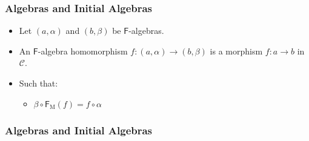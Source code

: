 \documentclass{beamer}
\DeclareMathOperator{\obj}{O}
\DeclareMathOperator{\mor}{M}
\newcommand{\comp}{\ensuremath{\mathrel{\circ}}}
\newcommand{\cat}[1]{\ensuremath{\mathcal{#1}}}
\newcommand{\func}[1]{\ensuremath{\mathsf{#1}}}
\newcommand{\funcO}[1]{\ensuremath{\func{#1}_{\obj}}}
\newcommand{\funcM}[1]{\ensuremath{\func{#1}_{\mor}}}
\begin{document}

\begin{frame}
  \frametitle{Algebras and Initial Algebras}

  \begin{definition}
    \begin{itemize}
    \item
      Let $(a,\alpha)$ and $(b,\beta)$ be \func{F}-algebras.
    \item
      An \func{F}-algebra homomorphism $f: (a,\alpha) \to (b,\beta)$
      is a morphism $f: a \to b$ in $\cat{C}$.
    \item
      Such that:
      \begin{itemize}
      \item
        $\beta \comp \funcM{F}(f) = f \comp \alpha$
      \end{itemize}
    \end{itemize}
  \end{definition}

\end{frame}


\begin{frame}
  \frametitle{Algebras and Initial Algebras}

  \begin{definition}
  \end{definition}
  \begin{center}
  \end{center}

\end{frame}

\end{document}
